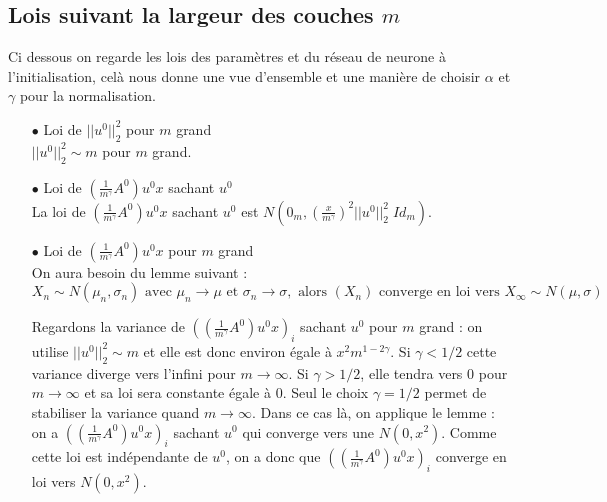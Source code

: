 \documentclass[a4paper, 11pt, french]{article}
\theoremstyle{definition}
\begin{document}
	\subsection{Lois suivant la largeur des couches $m$}
	
	Ci dessous on regarde les lois des paramètres et du réseau de neurone à l'initialisation, celà nous donne une vue d'ensemble et une manière de choisir $\alpha$ et $\gamma$ pour la normalisation.\\
	
	\begin{itemize}
		
		\item[$\bullet$] Loi de $ || u^0 ||_2^2$ pour $m$ grand \\
	
		$ || u^0 ||_2^2 \sim  m$  pour $m$ grand. \\
		
		\item[$\bullet$] Loi de $ \left(\frac{1}{m^{\gamma}} A^0 \right) u^0 x $ sachant $ u^0 $ \\
		
		La loi de $ \left(\frac{1}{m^{\gamma}} A^0 \right) u^0 x $ sachant $ u^0$ est $N(0_m, \left( \frac{x}{m^{\gamma}} \right)^2 || u^0 ||_2^2 \; Id_m) $. \\
	
		\item[$\bullet$] Loi de $ \left(\frac{1}{m^{\gamma}} A^0 \right) u^0 x $ pour $m$ grand \\
		
		On aura besoin du lemme suivant :
		\[X_{n} \sim N(\mu_{n},\sigma_{n}) \text{ avec }  \mu_{n}\to\mu \text{ et } \sigma_{n} \to \sigma, \text{ alors } (X_{n}) \text{ converge en loi vers } X_{\infty} \sim N(\mu,\sigma) \]
		
		Regardons la variance de $ \left(\left(\frac{1}{m^{\gamma}} A^0 \right) u^0 x \right)_i$ sachant $ u^0 $ pour $m$ grand : on utilise $ || u^0 ||_2^2 \sim  m$ et elle est donc environ égale à $x^2 m^{1 - 2\gamma}$. Si $\gamma < 1/2$ cette variance diverge vers l'infini pour $m \to \infty$. Si $\gamma > 1/2$, elle tendra vers 0 pour $m \to \infty$ et sa loi sera constante égale à 0. Seul le choix $\gamma = 1/2$ permet de stabiliser la variance quand $m \to \infty$. Dans ce cas là, on applique le lemme : on a $ \left(\left(\frac{1}{m^{\gamma}} A^0 \right) u^0 x \right)_i$ sachant $ u^0 $ qui converge vers une $N(0, x^2)$. Comme cette loi est indépendante de $u^0$, on a donc que $ \left(\left(\frac{1}{m^{\gamma}} A^0 \right) u^0 x \right)_i$ converge en loi vers $N(0,x^2)$. \\
		

\end{itemize}
\end{document}
